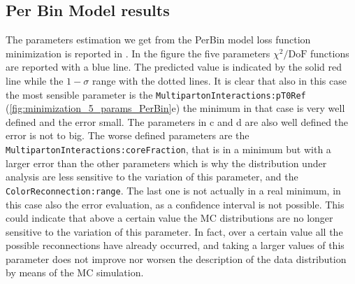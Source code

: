 \subsection{Per Bin Model results}

The parameters estimation we get from the PerBin model loss function minimization is reported in . In the figure the five parameters $\chi^2/\mathrm{DoF}$ functions are reported with a blue line. The predicted value is indicated by the solid red line while the $1-\sigma$ range with the dotted lines. 
It is clear that also in this case the most sensible parameter is the \texttt{MultipartonInteractions:pT0Ref} (\ref{fig:minimization_5_params_PerBin}e) the minimum in that case is very well defined and the error small. The parameters in c and d are also well defined the error is not to big. The worse defined parameters are  the \texttt{MultipartonInteractions:coreFraction}, that is in a minimum but with a larger error than the other parameters which is why the distribution under analysis are less sensitive to the variation of this parameter, and the \texttt{ColorReconnection:range}. The last one is not actually in a real minimum, in this case also the error evaluation, as a confidence interval is not possible. This could indicate that above a certain value the MC distributions are no longer  sensitive to the variation of this parameter. In fact, over a certain value all the possible reconnections have already occurred, and taking a larger values of this parameter does not improve nor worsen the description of the data distribution by means of the MC simulation.
  
